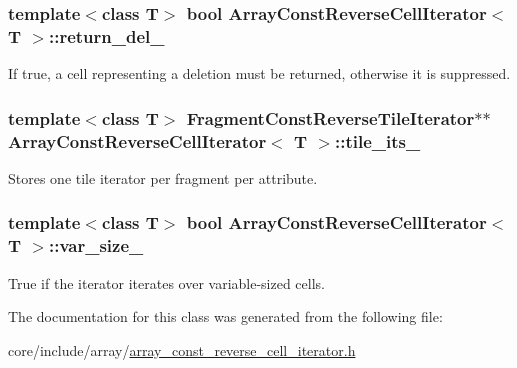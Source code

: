 \subsubsection[{return\+\_\+del\+\_\+}]{\setlength{\rightskip}{0pt plus 5cm}template$<$class T$>$ bool {\bf Array\+Const\+Reverse\+Cell\+Iterator}$<$ T $>$\+::return\+\_\+del\+\_\+\hspace{0.3cm}{\ttfamily [private]}}\label{classArrayConstReverseCellIterator_aee2b35201d187a50e2347e38d0a8d581}
If true, a cell representing a deletion must be returned, otherwise it is suppressed. \hypertarget{classArrayConstReverseCellIterator_a3d086e369f78d6674a056c2707acd636}{}
\subsubsection[{tile\+\_\+its\+\_\+}]{\setlength{\rightskip}{0pt plus 5cm}template$<$class T$>$ {\bf Fragment\+Const\+Reverse\+Tile\+Iterator}$\ast$$\ast$ {\bf Array\+Const\+Reverse\+Cell\+Iterator}$<$ T $>$\+::tile\+\_\+its\+\_\+\hspace{0.3cm}{\ttfamily [private]}}\label{classArrayConstReverseCellIterator_a3d086e369f78d6674a056c2707acd636}
Stores one tile iterator per fragment per attribute. \hypertarget{classArrayConstReverseCellIterator_a8e34b265ffd40c681da15b32a94c8580}{}
\subsubsection[{var\+\_\+size\+\_\+}]{\setlength{\rightskip}{0pt plus 5cm}template$<$class T$>$ bool {\bf Array\+Const\+Reverse\+Cell\+Iterator}$<$ T $>$\+::var\+\_\+size\+\_\+\hspace{0.3cm}{\ttfamily [private]}}\label{classArrayConstReverseCellIterator_a8e34b265ffd40c681da15b32a94c8580}
True if the iterator iterates over variable-\/sized cells. 

The documentation for this class was generated from the following file\+:\begin{DoxyCompactItemize}
\item 
core/include/array/\hyperlink{array__const__reverse__cell__iterator_8h}{array\+\_\+const\+\_\+reverse\+\_\+cell\+\_\+iterator.\+h}\end{DoxyCompactItemize}
